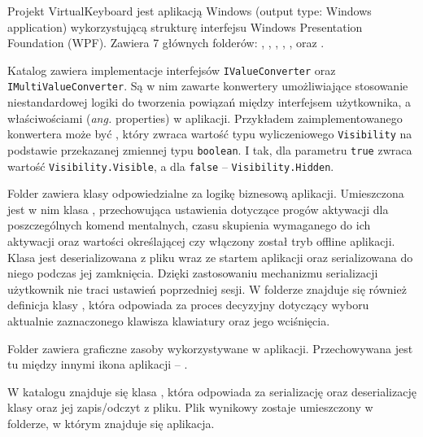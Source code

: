 \documentclass[skorowidz,skroty]{dyplomWEZUT}
\begin{document}
Projekt VirtualKeyboard jest aplikacją Windows (output type: Windows application) wykorzystującą strukturę interfejsu Windows Presentation Foundation (WPF). Zawiera 7 głównych folderów: , , , , ,  oraz .

Katalog  zawiera implementacje interfejsów \lstinline[language={[Sharp]C}]{IValueConverter} oraz \linebreak \lstinline[language={[Sharp]C}]{IMultiValueConverter}. Są w nim zawarte konwertery umożliwiające stosowanie niestandardowej logiki do tworzenia powiązań między interfejsem użytkownika, a właściwościami (\textit{ang.} properties) w aplikacji. Przykładem zaimplementowanego konwertera może być , który zwraca wartość typu wyliczeniowego \lstinline[language={[Sharp]C}]{Visibility} na podstawie przekazanej zmiennej typu \lstinline[language={[Sharp]C}]{boolean}. I tak, dla parametru \lstinline[language={[Sharp]C}]{true} zwraca wartość \lstinline[language={[Sharp]C}]{Visibility.Visible}, a dla \lstinline[language={[Sharp]C}]{false} -- \lstinline[language={[Sharp]C}]{Visibility.Hidden}.

Folder  zawiera klasy odpowiedzialne za logikę biznesową aplikacji. Umieszczona jest w nim klasa , przechowująca ustawienia dotyczące progów aktywacji dla poszczególnych komend mentalnych, czasu skupienia wymaganego do ich aktywacji oraz wartości określającej czy włączony został tryb offline aplikacji. Klasa jest deserializowana z pliku  wraz ze startem aplikacji oraz serializowana do niego podczas jej zamknięcia. Dzięki zastosowaniu mechanizmu serializacji użytkownik nie traci ustawień poprzedniej sesji. W folderze  znajduje się również definicja klasy , która odpowiada za proces decyzyjny dotyczący wyboru aktualnie zaznaczonego klawisza klawiatury oraz jego wciśnięcia.

Folder  zawiera graficzne zasoby wykorzystywane w aplikacji. Przechowywana jest tu między innymi ikona aplikacji -- .

W katalogu  znajduje się klasa , która odpowiada za serializację oraz deserializację klasy  oraz jej zapis/odczyt z pliku. Plik wynikowy  zostaje umieszczony w folderze, w którym znajduje się aplikacja.
\end{document}
